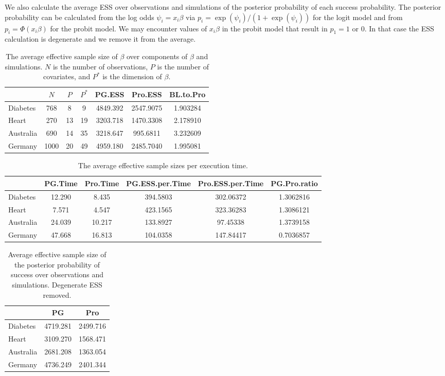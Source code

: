 \documentclass{article}
\begin{document}
We also calculate the average ESS over observations and simulations of the
posterior probability of each success probability.  The posterior probability
can be calculated from the log odds $\psi_i = x_i \beta$ via $p_i = \exp(\psi_i)
/ (1 + \exp(\psi_i))$ for the logit model and from $p_i = \Phi(x_i \beta)$ for
the probit model.  We may encounter values of $x_i \beta$ in the probit model
that result in $p_1 = 1$ or $0$.  In that case the ESS calculation is degenerate
and we remove it from the average.

\begin{table}
\centering
\begin{tabular}{l c c c c c c}
          & $N$  & $P$ & $P^*$ & PG.ESS   &  Pro.ESS  & BL.to.Pro \\
\hline
Diabetes  & 768  & 8   & 9  & 4849.392 & 2547.9075 & 1.903284  \\
Heart     & 270  & 13  & 19 & 3203.718 & 1470.3308 & 2.178910  \\
Australia & 690  & 14  & 35 & 3218.647 &  995.6811 & 3.232609  \\
Germany   & 1000 & 20  & 49 & 4959.180 & 2485.7040 & 1.995081  \\
\end{tabular}
\caption{The average effective sample size of $\beta$ over components of $\beta$ and 
  simulations.  $N$ is the number of observations, $P$ is the
  number of covariates, and $P^*$ is the dimension of $\beta$.}
\end{table}

\begin{table}
\centering
\begin{tabular}{l c c c c c}
           & PG.Time & Pro.Time & PG.ESS.per.Time & Pro.ESS.per.Time &
           PG.Pro.ratio \\
\hline
Diabetes   & 12.290  &    8.435 &        394.5803 &        302.06372 & 1.3062816    \\
Heart      &  7.571  &    4.547 &        423.1565 &        323.36283 & 1.3086121    \\
Australia  & 24.039  &   10.217 &        133.8927 &         97.45338 & 1.3739158    \\
Germany    & 47.668  &   16.813 &        104.0358 &        147.84417 & 0.7036857      
\end{tabular}
\caption{The average effective sample sizes per execution time.}
\end{table}

\begin{table}
\centering
\begin{tabular}{l c c}
          & PG       & Pro      \\
\hline
Diabetes  & 4719.281 & 2499.716 \\
Heart     & 3109.270 & 1568.471 \\
Australia & 2681.208 & 1363.054 \\
Germany   & 4736.249 & 2401.344
\end{tabular}
\caption{Average effective sample size of the posterior probability of success
  over observations and simulations.  Degenerate ESS removed.}
\end{table}
\end{document}
